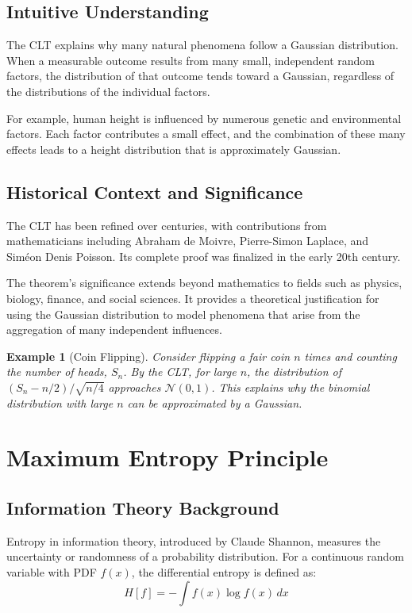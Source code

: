 \documentclass{article}
\newtheorem{example}{Example}
\begin{document}
\subsection{Intuitive Understanding}

The CLT explains why many natural phenomena follow a Gaussian distribution. When a measurable outcome results from many small, independent random factors, the distribution of that outcome tends toward a Gaussian, regardless of the distributions of the individual factors.

For example, human height is influenced by numerous genetic and environmental factors. Each factor contributes a small effect, and the combination of these many effects leads to a height distribution that is approximately Gaussian.

\subsection{Historical Context and Significance}

The CLT has been refined over centuries, with contributions from mathematicians including Abraham de Moivre, Pierre-Simon Laplace, and Siméon Denis Poisson. Its complete proof was finalized in the early 20th century.

The theorem's significance extends beyond mathematics to fields such as physics, biology, finance, and social sciences. It provides a theoretical justification for using the Gaussian distribution to model phenomena that arise from the aggregation of many independent influences.

\begin{example}[Coin Flipping]
Consider flipping a fair coin $n$ times and counting the number of heads, $S_n$. By the CLT, for large $n$, the distribution of $(S_n - n/2)/\sqrt{n/4}$ approaches $\mathcal{N}(0, 1)$. This explains why the binomial distribution with large $n$ can be approximated by a Gaussian.
\end{example}

\section{Maximum Entropy Principle}

\subsection{Information Theory Background}

Entropy in information theory, introduced by Claude Shannon, measures the uncertainty or randomness of a probability distribution. For a continuous random variable with PDF $f(x)$, the differential entropy is defined as:
\[
H[f] = -\int f(x) \log f(x) \, dx
\]
\end{document}
